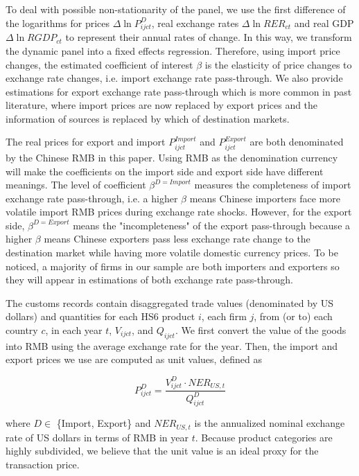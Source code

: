 \documentclass[12pt]{article}
\begin{document}
To deal with possible non-stationarity of the panel, we use the first difference of the logarithms for prices $\Delta \ln P^{D}_{i j c t}$, real exchange rates $\Delta \ln R E R_{c t}$ and real GDP $\Delta \ln R G D P_{c t}$ to represent their annual rates of change. In this way, we transform the dynamic panel into a fixed effects regression. Therefore, using import price changes, the estimated coefficient of interest $\beta$ is the elasticity of price changes to exchange rate changes, i.e. import exchange rate pass-through. We also provide estimations for export exchange rate pass-through which is more common in past literature, where import prices are now replaced by export prices and the information of sources is replaced by which of destination markets. 

The real prices for export and import $P^{Import}_{i j c t}$ and $P^{Export}_{i j c t}$ are both denominated by the Chinese RMB in this paper. Using RMB as the denomination currency will make the coefficients on the import side and export side have different meanings. The level of coefficient $\beta^{D=Import}$ measures the completeness of import exchange rate pass-through, i.e. a higher $\beta$ means Chinese importers face more volatile import RMB prices during exchange rate shocks. However, for the export side,  $\beta^{D=Export}$ means the "incompleteness" of the export pass-through because a higher $\beta$ means Chinese exporters pass less exchange rate change to the destination market while having more volatile domestic currency prices. To be noticed, a majority of firms in our sample are both importers and exporters so they will appear in estimations of both exchange rate pass-through.

The customs records contain disaggregated trade values (denominated by US dollars) and quantities for each HS6 product $i$, each firm $j$, from (or to) each country $c$, in each year $t$, $V_{ijct}$, and $Q_{ijct}$. We first convert the value of the goods into RMB using the average exchange rate for the year. Then, the import and export prices we use are computed as unit values, defined as 

$$
P^{D}_{ijct}=\frac{V^{D}_{ijct}\cdot NER_{US,t}}{Q^{D}_{ijct}}
$$

where $D \in$ \{Import, Export\} and $NER_{US,t}$ is the annualized nominal exchange rate of US dollars in terms of RMB in year $t$. Because product categories are highly subdivided, we believe that the unit value is an ideal proxy for the transaction price.
\end{document}
